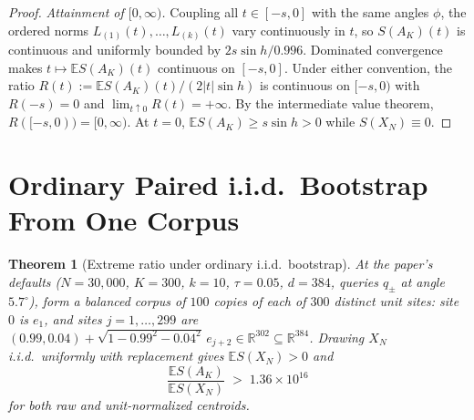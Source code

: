 \documentclass[11pt]{article}
\theoremstyle{plain}
\newtheorem{theorem}{Theorem}
\theoremstyle{definition}
\theoremstyle{remark}
\begin{document}
\begin{proof}
\emph{Attainment of $[0, \infty)$.} Coupling all $t \in [-s, 0]$ with the same angles $\phi$, the ordered norms $L_{(1)}(t), \dots, L_{(k)}(t)$ vary continuously in $t$, so $S(A_K)(t)$ is continuous and uniformly bounded by $2s\sin h / 0.996$. Dominated convergence makes $t \mapsto \mathbb{E}S(A_K)(t)$ continuous on $[-s, 0]$. Under either convention, the ratio $R(t) := \mathbb{E}S(A_K)(t)/(2|t|\sin h)$ is continuous on $[-s, 0)$ with $R(-s) = 0$ and $\lim_{t \uparrow 0} R(t) = +\infty$. By the intermediate value theorem, $R([-s, 0)) = [0, \infty)$. At $t = 0$, $\mathbb{E}S(A_K) \ge s\sin h > 0$ while $S(X_N) \equiv 0$.
\end{proof}

\section{Ordinary Paired i.i.d.\ Bootstrap From One Corpus}

\begin{theorem}[Extreme ratio under ordinary i.i.d.\ bootstrap]\label{thm:bootstrap}
At the paper's defaults ($N = 30{,}000$, $K = 300$, $k = 10$, $\tau = 0.05$, $d = 384$, queries $q_\pm$ at angle $5.7^\circ$), form a balanced corpus of $100$ copies of each of $300$ distinct unit sites: site~$0$ is $e_1$, and sites $j = 1, \dots, 299$ are $(0.99, 0.04) + \sqrt{1 - 0.99^2 - 0.04^2}\, e_{j+2} \in \mathbb{R}^{302} \subseteq \mathbb{R}^{384}$. Drawing $X_N$ i.i.d.\ uniformly with replacement gives $\mathbb{E}S(X_N) > 0$ and
\[
\frac{\mathbb{E}S(A_K)}{\mathbb{E}S(X_N)} \;>\; 1.36 \times 10^{16}
\]
for both raw and unit-normalized centroids.
\end{theorem}
\end{document}
